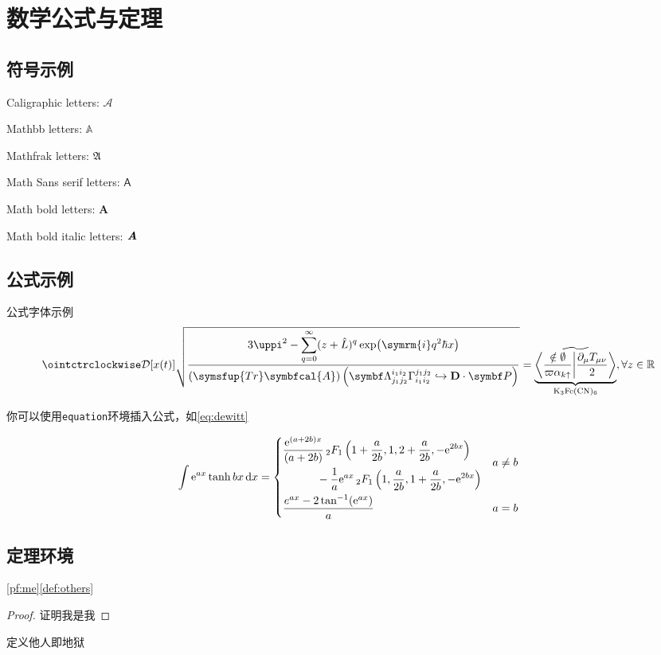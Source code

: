\chapter{数学公式与定理}

\section{符号示例}

Caligraphic letters: $\mathcal{A}$ 

Mathbb letters: $\mathbb{A}$

Mathfrak letters: $\mathfrak{A}$

Math Sans serif letters: $\mathsf{A}$

Math bold letters: $\mathbf{A}$

Math bold italic letters: $\textbf{\em A}$

\section{公式示例}

公式字体示例
\[
    \displaystyle \ointctrclockwise\mathcal{D}[x(t)]\sqrt{\frac{\displaystyle3\uppi^2-\sum_{q=0}^{\infty}(z+\hat L)^{q}\exp(\symrm{i}q^2 \hbar x)}{\displaystyle (\symsfup{Tr}\symbfcal{A})\left(\symbf\Lambda_{j_1j_2}^{i_1i_2}\Gamma_{i_1i_2}^{j_1j_2}\hookrightarrow\vec D\cdot \symbf P  \right)}}
    =\underbrace{\widetilde{\left\langle \frac{\notin \emptyset}{\varpi\alpha_{k\uparrow}}\middle\vert \frac{\partial_\mu T_{\mu\nu}}{2}\right\rangle}}_{\mathrm{K}_3\mathrm{Fe}(\mathrm{CN})_6} ,\forall z \in \mathbb{R}
\]

你可以使用\verb|equation|环境插入公式，如\cref{eq:dewitt}

\begin{equation}\label{eq:dewitt}
    \int \mathrm{e}^{ax} \tanh {bx} \, \mathrm{d}x =
    \begin{dcases}
        \begin{multlined}
            \frac{\mathrm{e}^{(a+2b)x}}{(a + 2b)} \,
            {{}_2F_1} \left( 1 + \frac{a}{2b}, 1, 2+\frac{a}{2b}, -\mathrm{e}^{2bx} \right) \\
            - \frac{1}{a} \mathrm{e}^{ax} \, {{}_2F_1} \left( 1, \frac{a}{2b}, 1 + \frac{a}{2b}, -\mathrm{e}^{2bx} \right)
        \end{multlined}
        & a \ne b \\
    \frac{e^{ax} - 2 \tan^{-1}(\mathrm{e}^{ax})}{a} & a = b
  \end{dcases}
\end{equation}

\section{定理环境}

\cref{pf:me}\cref{def:others}

\begin{proof}\label{pf:me}
    证明我是我
\end{proof}

\begin{definition}[他人]\label{def:others}
    定义他人即地狱
\end{definition}

